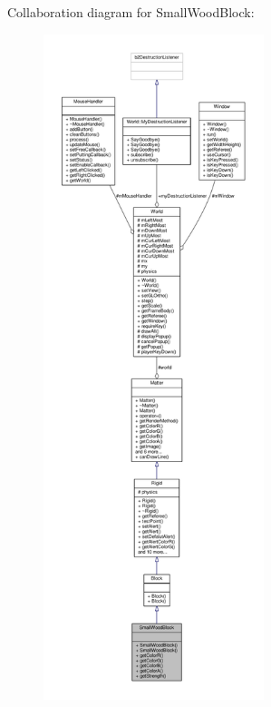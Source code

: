 Collaboration diagram for Small\+Wood\+Block\+:\nopagebreak
\begin{figure}[H]
\begin{center}
\leavevmode
\includegraphics[height=550pt]{classSmallWoodBlock__coll__graph}
\end{center}
\end{figure}
